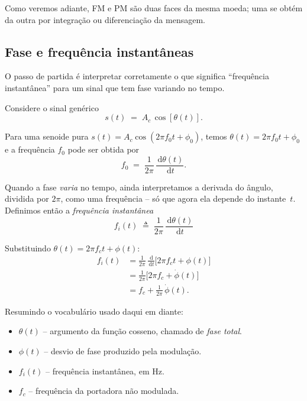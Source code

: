 \documentclass[11pt,a4paper]{article}
\newcommand{\dd}{\,\mathrm{d}}
\begin{document}
Como veremos adiante, FM e PM são duas faces da mesma moeda; uma se obtém da outra por integração ou diferenciação da mensagem.

\subsection{Fase e frequência instantâneas}

O passo de partida é interpretar corretamente o que significa ``frequência instantânea'' para um sinal que tem fase variando no tempo.

\begin{quadro}
Considere o sinal genérico
\[
  s(t) \;=\; A_c\,\cos[\theta(t)].
\]

Para uma senoide pura $s(t) = A_c\cos(2\pi f_0 t + \phi_0)$, temos $\theta(t)=2\pi f_0 t+\phi_0$ e a frequência $f_0$ pode ser obtida por
\[
  f_0 \;=\; \frac{1}{2\pi}\,\frac{\dd \theta(t)}{\dd t}.
\]

Quando a fase \emph{varia} no tempo, ainda interpretamos a derivada do ângulo, dividida por $2\pi$, como uma frequência -- só que agora ela depende do instante~$t$. Definimos então a \emph{frequência instantânea}
\[
  \boxed{\,f_i(t) \;\triangleq\; \frac{1}{2\pi}\,\frac{\dd \theta(t)}{\dd t}\,}
\]

Substituindo $\theta(t)=2\pi f_c t+\phi(t)$:
\begin{align*}
  f_i(t)
  &= \frac{1}{2\pi}\,\frac{\dd}{\dd t}\bigl[2\pi f_c t + \phi(t)\bigr] \\
  &= \frac{1}{2\pi}\bigl[2\pi f_c + \dot\phi(t)\bigr] \\
  &= f_c + \frac{1}{2\pi}\,\dot\phi(t).
\end{align*}
\end{quadro}

Resumindo o vocabulário usado daqui em diante:
\begin{itemize}
  \item $\theta(t)$ -- argumento da função cosseno, chamado de \emph{fase total}.
  \item $\phi(t)$ -- desvio de fase produzido pela modulação.
  \item $f_i(t)$ -- frequência instantânea, em Hz.
  \item $f_c$ -- frequência da portadora não modulada.
\end{itemize}

\end{document}
